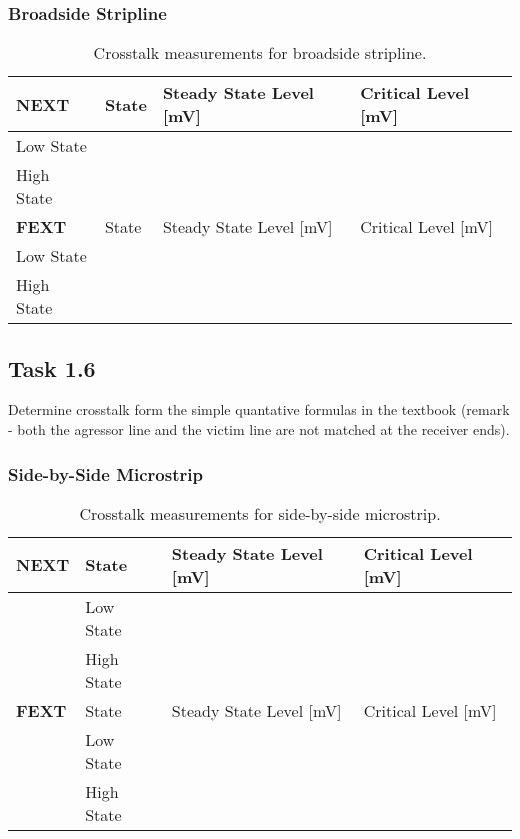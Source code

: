 \documentclass[../main.tex]{subfiles}
\begin{document}
\subsubsection{Broadside Stripline}

\begin{table}[h]
    \centering
    \begin{tabular}{l|l l l}
        \toprule[1pt]
        \textbf{NEXT} & State & Steady State Level [mV] & Critical Level [mV] \\
        \midrule
        Low State & & & \\
        High State & & & \\
        \midrule[1pt]
        \textbf{FEXT} & State & Steady State Level [mV] & Critical Level [mV] \\
        \midrule
        Low State & & & \\
        High State & & & \\
        \bottomrule[1pt]
    \end{tabular}
    \caption{Crosstalk measurements for broadside stripline.}
    \label{tab:sim-broadside-stripline}
\end{table}

\newpage

\subsection{Task 1.6}

Determine crosstalk form the simple quantative formulas in the textbook (remark - both the agressor line and the victim line are not matched at the receiver ends).

\solution

\subsubsection{Side-by-Side Microstrip}

\begin{table}[h]
    \centering
    \begin{tabular}{l l|l l}
        \toprule[1pt]
        \textbf{NEXT} & State & Steady State Level [mV] & Critical Level [mV] \\
        \midrule
        & Low State & & \\
        & High State & & \\
        \midrule[1pt]
        \textbf{FEXT} & State & Steady State Level [mV] & Critical Level [mV] \\
        \midrule
        & Low State & & \\
        & High State & & \\
        \bottomrule[1pt]
    \end{tabular}
    \caption{Crosstalk measurements for side-by-side microstrip.}
    \label{tab:calc-side-by-side-microstrip}
\end{table}
\end{document}
